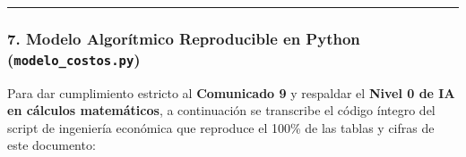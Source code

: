 \begin{center}\rule{0.5\linewidth}{0.5pt}\end{center}

\subsubsection{\texorpdfstring{7. Modelo Algorítmico Reproducible en Python (\texttt{modelo\_costos.py})}{7. Modelo Algorítmico Reproducible en Python (modelo\_costos.py)}}\label{modelo-algoruxedtmico-reproducible-en-python-modelo_costos.py}

Para dar cumplimiento estricto al \textbf{Comunicado 9} y respaldar el \textbf{Nivel 0 de IA en cálculos matemáticos}, a continuación se transcribe el código íntegro del script de ingeniería económica que reproduce el 100\% de las tablas y cifras de este documento:

